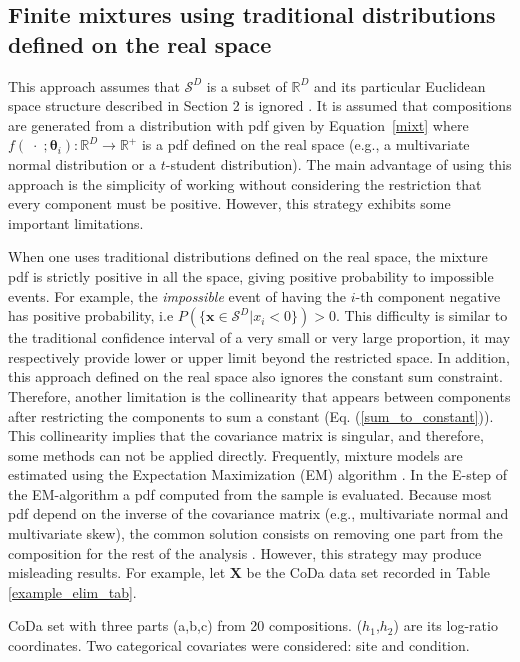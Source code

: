 \documentclass[12pt, a4paper]{article}
\newcommand{\m}[1]{\boldsymbol{#1}}
\begin{document}
\subsection{Finite mixtures using traditional distributions defined on the real space}
\label{real_section}

This approach assumes that $\mathcal{S}^D$ is a subset of $\mathbb{R}^D$ and its particular Euclidean space structure described in Section 2 is ignored \citep[see][]{papageorgiou2001model}. It is assumed that compositions  are generated from a distribution with pdf given by Equation~\ref{mixt} where $f(\;\cdot\;;\m\theta_i): \mathbb{R}^D \rightarrow \mathbb{R}^+$ is a pdf defined on the real space (e.g., a multivariate normal distribution or a  $t$-student distribution). The main advantage of using this approach is the simplicity of working without considering the restriction that every component must be positive. However, this strategy exhibits some important limitations.

When one uses traditional distributions defined on the real space, the mixture pdf is strictly positive in all the space, giving positive probability to impossible events. For example, the \emph{impossible} event  of having the $i$-th component negative has positive probability, i.e $P(\{ \textbf{x} \in \mathcal{S}^D | x_i < 0 \}) > 0$. This difficulty is similar to the traditional confidence interval of a very small or very large proportion, it may respectively provide lower or upper limit beyond the restricted space. In addition, this approach defined on the real space also ignores the constant sum constraint. Therefore, another limitation is the collinearity that appears between components  after restricting the components to sum a constant (Eq. (\ref{sum_to_constant})). This collinearity implies that the covariance matrix is singular, and therefore, some methods can not be applied directly. Frequently, mixture models are estimated using the Expectation Maximization (EM) algorithm \citep{dempster1977maximum}. In the E-step of the EM-algorithm a pdf computed from the sample is evaluated. Because most pdf depend on the inverse of the covariance matrix (e.g., multivariate normal and multivariate skew), the common solution consists on removing one part from the composition for the rest of the analysis \citep{papageorgiou2001model}. However, this strategy may  produce misleading results. For example, let $\mathbf{X}$ be the CoDa data set recorded in Table \ref{example_elim_tab}.  


\begin{table}
\centering
\scriptsize

\caption{CoDa set with three parts (a,b,c) from 20 compositions. ($h_1$,$h_2$) are its log-ratio coordinates.
Two categorical covariates were considered: site and condition. }
\label{example_elim_tab}
\end{table}
\end{document}
